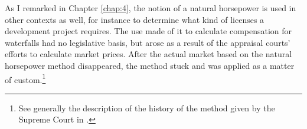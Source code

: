 As I remarked in Chapter \ref{chap:4}, the notion of a natural horsepower is used in other contexts as well, for instance to determine what kind of licenses a development project requires. The use made of it to calculate compensation for waterfalls had no legislative basis, but arose as a result of the appraisal courts' efforts to calculate market prices. After the actual market based on the natural horsepower method disappeared, the method stuck and was applied as a matter of custom.\footnote{See generally the description of the history of the method given by the Supreme Court in \cite{uleberg08}.}
%
%
%

